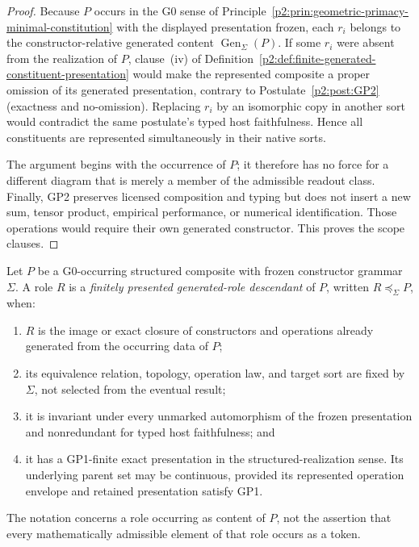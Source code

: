 \documentclass[12pt,a4paper]{article}
\begin{document}
\begin{proof}
Because \(P\) occurs in the G0 sense of Principle~\ref{p2:prin:geometric-primacy-minimal-constitution} with the displayed presentation frozen, each \(r_i\)
belongs to the constructor-relative generated content
\(\operatorname{Gen}_{\Sigma}(P)\).  If some \(r_i\) were absent from the
realization of \(P\), clause~(iv) of
Definition~\ref{p2:def:finite-generated-constituent-presentation} would make
the represented composite a proper omission of its generated presentation,
contrary to Postulate~\ref{p2:post:GP2} (exactness and no-omission).
Replacing \(r_i\) by an isomorphic copy in another sort would contradict the
same postulate's typed host faithfulness.  Hence all
constituents are represented simultaneously in their native sorts.

The argument begins with the occurrence of \(P\); it therefore has no force
for a different diagram that is merely a member of the admissible readout
class.  Finally, GP2 preserves licensed composition and typing but does not
insert a new sum, tensor product, empirical performance, or numerical
identification.  Those operations would require their own generated
constructor.  This proves the scope clauses.
\end{proof}

\begin{definition}
\label{p2:def:finitely-presented-generated-role-descendant}
Let \(P\) be a G0-occurring structured composite with frozen constructor
grammar \(\Sigma\).  A role \(R\) is a \emph{finitely presented
generated-role descendant} of \(P\), written \(R\preccurlyeq_\Sigma P\),
when:
\begin{enumerate}[label=(\roman*),leftmargin=2em]
\item \(R\) is the image or exact closure of constructors and operations
      already generated from the occurring data of \(P\);
\item its equivalence relation, topology, operation law, and target sort are
      fixed by \(\Sigma\), not selected from the eventual result;
\item it is invariant under every unmarked automorphism of the frozen
      presentation and nonredundant for typed host faithfulness; and
\item it has a GP1-finite exact presentation in the structured-realization
      sense.  Its underlying parent set may be continuous, provided its
      represented operation envelope and retained presentation satisfy GP1.
\end{enumerate}
The notation concerns a role occurring as content of \(P\), not the assertion
that every mathematically admissible element of that role occurs as a token.
\end{definition}
\end{document}
